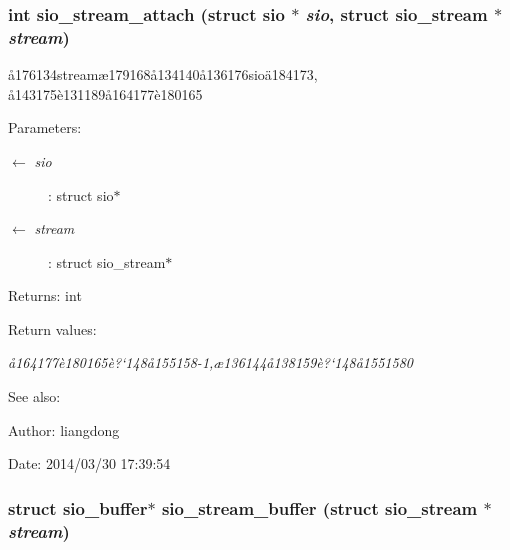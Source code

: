 \subsubsection{\setlength{\rightskip}{0pt plus 5cm}int sio\_\-stream\_\-attach (struct sio $\ast$ {\em sio}, struct sio\_\-stream $\ast$ {\em stream})}\label{sio__stream_8h_a13}


\aa{}176134stream\ae{}179168\aa{}134140\aa{}136176sio\"{a}184173, \aa{}143175\`{e}131189\aa{}164177\`{e}180165 

\begin{Desc}
\item[Parameters:]
\begin{description}
\item[\mbox{$\leftarrow$} {\em sio}]: struct sio$\ast$ \item[\mbox{$\leftarrow$} {\em stream}]: struct sio\_\-stream$\ast$ \end{description}
\end{Desc}
\begin{Desc}
\item[Returns:]int \end{Desc}
\begin{Desc}
\item[Return values:]
\begin{description}
\item[{\em \aa{}164177\`{e}180165\`{e}?`148\aa{}155158-1,\ae{}136144\aa{}138159\`{e}?`148\aa{}1551580}]\end{description}
\end{Desc}
\begin{Desc}
\item[See also:]\end{Desc}
\begin{Desc}
\item[Author:]liangdong \end{Desc}
\begin{Desc}
\item[Date:]2014/03/30 17:39:54 \end{Desc}
\subsubsection{\setlength{\rightskip}{0pt plus 5cm}struct sio\_\-buffer$\ast$ sio\_\-stream\_\-buffer (struct sio\_\-stream $\ast$ {\em stream})}\label{sio__stream_8h_a15}


